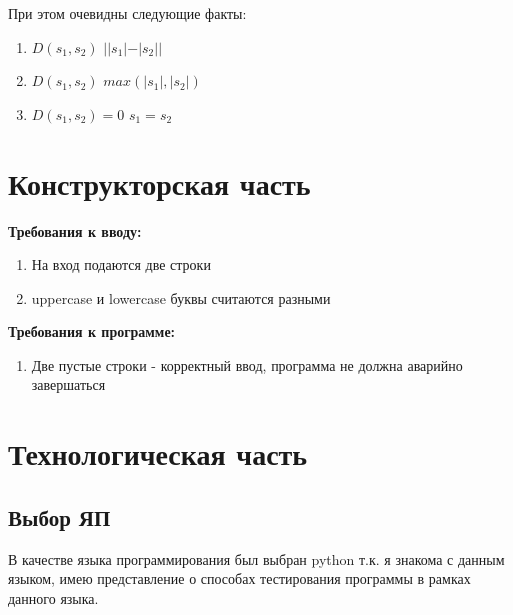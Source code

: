 \documentclass[12pt]{report}
\begin{document}
При этом очевидны следующие факты:
\begin{enumerate}
	\item $D(s_{1}, s_{2})$ \geq $ ||s_{1}| - |s_{2}||$
	\item $D(s_{1}, s_{2})$ \leq $ max(|s_{1}|, |s_{2}|)$
	\item $D(s_{1}, s_{2}) = 0$ \Leftrightarrow $ s_{1} = s_{2}$
\end{enumerate}
%
%


\chapter{Конструкторская часть}
\textbf{Требования к вводу:}
\begin{enumerate}
  	\item На вход подаются две строки
	\item uppercase и lowercase буквы считаются разными
\end{enumerate}
\textbf{Требования к программе:}
\begin{enumerate}
  	\item Две пустые строки - корректный ввод, программа не должна аварийно завершаться
\end{enumerate}


\chapter{Технологическая часть}
\section{Выбор ЯП}
В качестве языка программирования был выбран python т.к. я знакома с данным языком, имею представление о способах тестирования программы в рамках данного языка.
\end{document}
